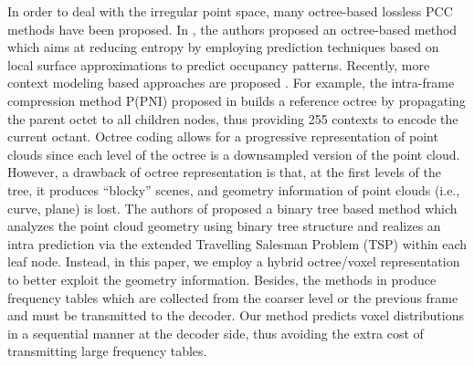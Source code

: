 \par In order to deal with the irregular point space, many octree-based lossless PCC methods have been proposed. In \cite{schnabel2006octree}, the authors proposed an octree-based method which aims at reducing entropy by employing prediction techniques based on local surface approximations to predict occupancy patterns. Recently, more context modeling based approaches are proposed \cite{garcia2017context, garcia2018intra, garcia2019geometry}. For example, the intra-frame compression method P(PNI) proposed in \cite{garcia2019geometry} builds a reference octree by propagating the parent octet to all children nodes, thus providing 255 contexts to encode the current octant. Octree coding allows for a progressive representation of point clouds since each level of the octree is a downsampled version of the point cloud. However, a drawback of octree representation is that, at the first levels of the tree, it produces ``blocky'' scenes, and geometry information of point clouds (i.e., curve, plane) is lost. The authors of \cite{8122226} proposed a binary tree based method which analyzes the point cloud geometry using binary tree structure and realizes an intra prediction via the extended Travelling Salesman Problem (TSP) within each leaf node. Instead, in this paper, we employ a hybrid octree/voxel representation to better exploit the geometry information. Besides,  the methods in \cite{garcia2017context, garcia2018intra, garcia2019geometry} produce frequency tables which are collected from the coarser level or the previous frame and must be transmitted to the decoder. Our method predicts voxel distributions in a sequential manner at the decoder side, thus avoiding the extra cost of transmitting large frequency tables.
